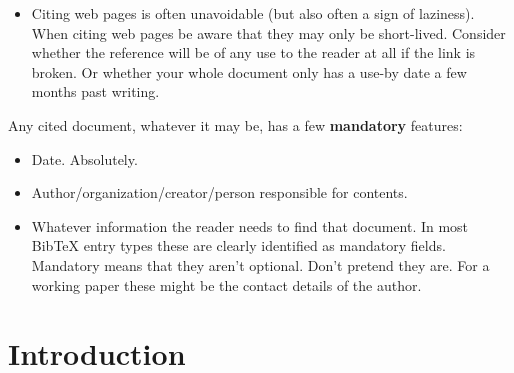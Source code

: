 \documentclass[a4paper,twoside, openright,12pt]{report}
\begin{document}
\begin{itemize}
\item Citing web pages is often unavoidable (but also often a sign of laziness). When citing web pages be aware that they may only be short-lived. Consider whether the reference will be of any use to the reader at all if the link is broken. Or whether your whole document only has a use-by date a few months past writing.

\end{itemize}

Any cited document, whatever it may be, has a few \textbf{mandatory} features:
\begin{itemize}
	\item Date. Absolutely. 
	\item Author/organization/creator/person responsible for contents.
	\item Whatever information the reader needs to find that document. In most BibTeX entry types these are clearly identified as mandatory fields. Mandatory means that they aren't optional. Don't pretend they are. For a working paper these might be the contact details of the author.
\end{itemize}





\chapter{Introduction}
\end{document}
